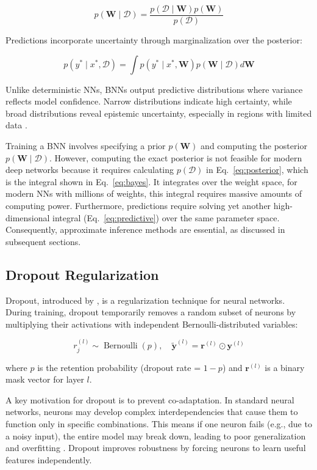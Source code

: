 \begin{equation}
p(\mathbf{W} \mid \mathcal{D}) = \frac{p(\mathcal{D} \mid \mathbf{W})  p(\mathbf{W})}{p(\mathcal{D})}
\label{eq:posterior}
\end{equation}

Predictions incorporate uncertainty through marginalization over the posterior:

\begin{equation}
p(y^* \mid x^*, \mathcal{D}) = \int p(y^* \mid x^*, \mathbf{W})  p(\mathbf{W} \mid \mathcal{D})  d\mathbf{W}
\label{eq:predictive}
\end{equation}

Unlike deterministic NNs, BNNs output predictive distributions where variance reflects model confidence.
Narrow distributions indicate high certainty, while broad distributions reveal epistemic uncertainty,
especially in regions with limited data \citep{Jospin2022bnns}.

Training a BNN involves specifying a prior $p(\mathbf{W})$ and computing the posterior $p(\mathbf{W}
\mid \mathcal{D})$. However, computing the exact posterior is not feasible for modern deep networks
because it requires calculating $p(\mathcal{D})$ in Eq.~\eqref{eq:posterior}, which is the integral
shown in Eq.~\eqref{eq:bayes}. It integrates over the weight space, for modern NNs with millions of
weights, this integral requires massive amounts of computing power. Furthermore, predictions require
solving yet another high-dimensional integral (Eq.~\eqref{eq:predictive}) over the same parameter
space. Consequently, approximate inference methods are essential, as discussed in subsequent sections.


\subsection{Dropout Regularization}
\label{methodology:dropout}
Dropout, introduced by \citet{srivastava2014dropout}, is a regularization technique for neural networks.
During training, dropout temporarily removes a random subset of neurons by multiplying their activations
with independent Bernoulli-distributed variables:

\[
r_j^{(l)} \sim \operatorname{Bernoulli}(p), 
\quad 
\tilde{\mathbf{y}}^{(l)} = \mathbf{r}^{(l)} \odot \mathbf{y}^{(l)}
\]

where $p$ is the retention probability (dropout rate = $1-p$) and $\mathbf{r}^{(l)}$ is a binary mask vector for layer $l$.

A key motivation for dropout is to prevent co-adaptation. In standard neural networks,
neurons may develop complex interdependencies that cause them to function only in specific combinations.
This means if one neuron fails (e.g., due to a noisy input), the entire model may break down,
leading to poor generalization and overfitting \citep{hinton2012}.
Dropout improves robustness by forcing neurons to learn useful features independently.

